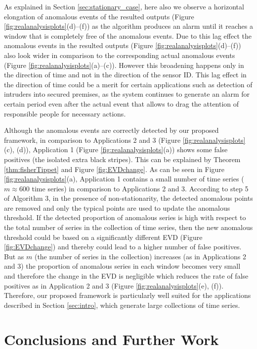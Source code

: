 \documentclass[12pt]{article}
\begin{document}
As explained in Section \ref{sec:stationary_case}, here also we observe
a horizontal elongation of anomalous events of the resulted outputs
(Figure \ref{fig:realanalysisplots}(d)--(f)) as the algorithm produces
an alarm until it reaches a window that is completely free of the
anomalous events. Due to this lag effect the anomalous events in the
resulted outputs (Figure \ref{fig:realanalysisplots}(d)--(f)) also look
wider in comparison to the corresponding actual anomalous events (Figure
\ref{fig:realanalysisplots}(a)--(c)). However this broadening happens
only in the direction of time and not in the direction of the sensor ID.
This lag effect in the direction of time could be a merit for certain
applications such as detection of intruders into secured premises, as
the system continues to generate an alarm for certain period even after
the actual event that allows to drag the attention of responsible people
for necessary actions.

Although the anomalous events are correctly detected by our proposed
framework, in comparison to Applications 2 and 3 (Figure
\ref{fig:realanalysisplots}(c), (d)), Application 1 (Figure
\ref{fig:realanalysisplots}(a)) shows some false positives (the isolated
extra black stripes). This can be explained by Theorem
\ref{thm:fisherTippet} and Figure \ref{fig:EVDchange}. As can be seen in
Figure \ref{fig:realanalysisplots}(a), Application 1 contains a small
number of time series (\(m \approx600\) time series) in comparison to
Applications 2 and 3. According to step 5 of Algorithm 3, in the
presence of non-stationarity, the detected anomalous points are removed
and only the typical points are used to update the anomalous threshold.
If the detected proportion of anomalous series is high with respect to
the total number of series in the collection of time series, then the
new anomalous threshold could be based on a significantly different EVD
(Figure \ref{fig:EVDchange}) and thereby could lead to a higher number
of false positives. But as \(m\) (the number of series in the
collection) increases (as in Applications 2 and 3) the proportion of
anomalous series in each window becomes very small and therefore the
change in the EVD is negligible which reduces the rate of false
positives as in Application 2 and 3 (Figure
\ref{fig:realanalysisplots}(e), (f)). Therefore, our proposed framework
is particularly well suited for the applications described in Section
\ref{sec:intro}, which generate large collections of time series.

\hypertarget{conclusions-and-further-work}{%
\section{Conclusions and Further
Work}\label{conclusions-and-further-work}}
\end{document}

